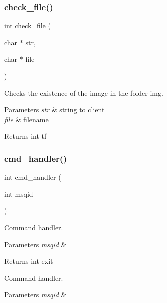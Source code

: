 \subsubsection{check\+\_\+file()}
{\footnotesize\ttfamily int check\+\_\+file (\begin{DoxyParamCaption}\item[{char $\ast$}]{str,  }\item[{char $\ast$}]{file }\end{DoxyParamCaption})}



Checks the existence of the image in the folder img. 


\begin{DoxyParams}{Parameters}
{\em str} & string to client \\
\hline
{\em file} & filename \\
\hline
\end{DoxyParams}
\begin{DoxyReturn}{Returns}
int tf 
\end{DoxyReturn}
\mbox{\label{fileserv_8h_a17e3a23bd1ae378882eab0ef0f856de1}} 
\subsubsection{cmd\+\_\+handler()}
{\footnotesize\ttfamily int cmd\+\_\+handler (\begin{DoxyParamCaption}\item[{int}]{msqid }\end{DoxyParamCaption})}



Command handler. 


\begin{DoxyParams}{Parameters}
{\em msqid} & \\
\hline
\end{DoxyParams}
\begin{DoxyReturn}{Returns}
int exit
\end{DoxyReturn}
Command handler.


\begin{DoxyParams}{Parameters}
{\em msqid} & \\
\hline
\end{DoxyParams}
\mbox{\label{fileserv_8h_a49cfaf7b6d546c559fb0901bd5ba3e65}} 
